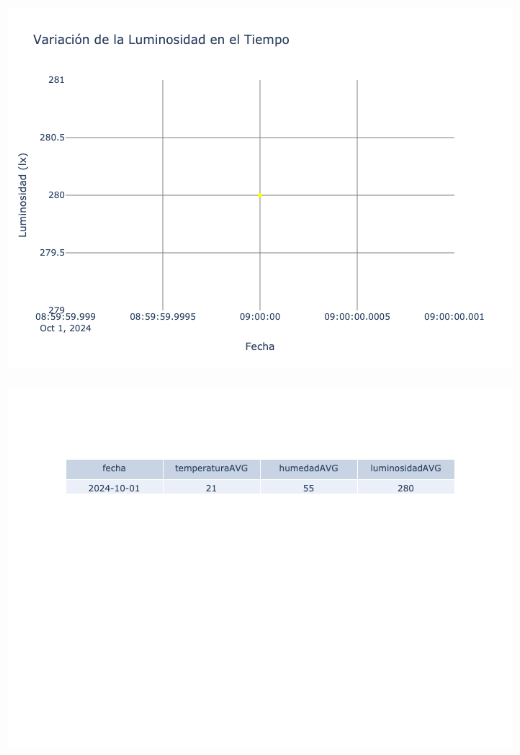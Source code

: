 \documentclass{article}
\begin{document}
    \noindent
    \begin{minipage}{0.48\textwidth}
        \centering
        \includegraphics[width=\textwidth]{../img/poli/LS102-90Dias-03-12-2024.png}
    \end{minipage}
    \hfill
    \begin{minipage}{0.48\textwidth}
        \centering
        \includegraphics[width=\textwidth]{../img/tables/CAVG102-90Dias-03-12-2024.png}
    \end{minipage}
    
\end{document}
